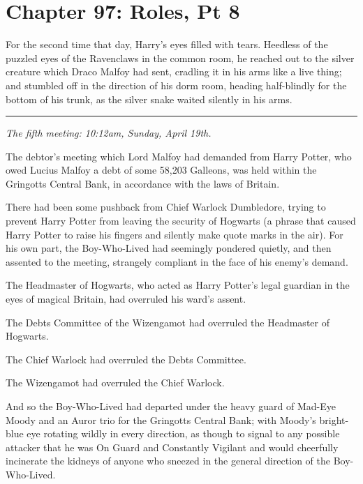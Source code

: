 \chapter{Chapter 97: Roles, Pt 8}
For the second time that day, Harry's eyes filled with tears. Heedless
of the puzzled eyes of the Ravenclaws in the common room, he reached out
to the silver creature which Draco Malfoy had sent, cradling it in his
arms like a live thing; and stumbled off in the direction of his dorm
room, heading half-blindly for the bottom of his trunk, as the silver
snake waited silently in his arms.

\begin{center}\rule{3in}{0.4pt}\end{center}

\emph{The fifth meeting: 10:12am, Sunday, April 19th.}

The debtor's meeting which Lord Malfoy had demanded from Harry Potter,
who owed Lucius Malfoy a debt of some 58,203 Galleons, was held within
the Gringotts Central Bank, in accordance with the laws of Britain.

There had been some pushback from Chief Warlock Dumbledore, trying to
prevent Harry Potter from leaving the security of Hogwarts (a phrase
that caused Harry Potter to raise his fingers and silently make quote
marks in the air). For his own part, the Boy-Who-Lived had seemingly
pondered quietly, and then assented to the meeting, strangely compliant
in the face of his enemy's demand.

The Headmaster of Hogwarts, who acted as Harry Potter's legal guardian
in the eyes of magical Britain, had overruled his ward's assent.

The Debts Committee of the Wizengamot had overruled the Headmaster of
Hogwarts.

The Chief Warlock had overruled the Debts Committee.

The Wizengamot had overruled the Chief Warlock.

And so the Boy-Who-Lived had departed under the heavy guard of Mad-Eye
Moody and an Auror trio for the Gringotts Central Bank; with Moody's
bright-blue eye rotating wildly in every direction, as though to signal
to any possible attacker that he was On Guard and Constantly Vigilant
and would cheerfully incinerate the kidneys of anyone who sneezed in the
general direction of the Boy-Who-Lived.

